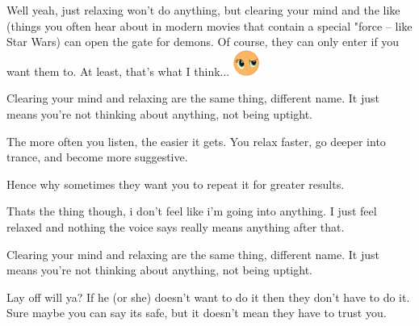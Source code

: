 \documentclass[ebook,12pt,oneside,openany]{memoir}
\newcommand{\mytexttilde}{\raisebox{0.5ex}{\texttildelow}}
\begin{document}
\begin{tcolorbox}[title=Harmonic Revelations,colback=brown!5!white,colframe=brown!75!black,coltitle=white]
\begin{tcolorbox}[title=\mytexttilde{}Chaotic Chicken\mytexttilde{}]
\par{Well yeah, just relaxing won't do anything, but clearing your mind and the like (things you often hear about in modern movies that contain a special "force -- like Star Wars) can open the gate for demons. Of course, they can only enter if you want them to. At least, that's what I think...  \includegraphics{images/mlp_huh.png}}
\end{tcolorbox}
\par{Clearing your mind and relaxing are the same thing, different name. It just means you're not thinking about anything, not being uptight.}
\end{tcolorbox}
\begin{tcolorbox}[title=The Original,colback=green!5!white,colframe=green!75!black,coltitle=white]
\begin{tcolorbox}[title=Chigens and Kay]
\par{The more often you listen, the easier it gets. You relax faster, go deeper into trance, and become more suggestive.}
\newline{}
\par{Hence why sometimes they want you to repeat it for greater results.}
\end{tcolorbox}
\par{Thats the thing though, i don't feel like i'm going into anything. I just feel relaxed and nothing the voice says really means anything after that.}
\newline{}
\begin{tcolorbox}[title=\mytexttilde{}Lawful Aeternae Salvtis\mytexttilde{}]
\par{Clearing your mind and relaxing are the same thing, different name. It just means you're not thinking about anything, not being uptight.}
\end{tcolorbox}
\par{Lay off will ya? If he (or she) doesn't want to do it then they don't have to do it. Sure maybe you can say its safe, but it doesn't mean they have to trust you. }
\end{tcolorbox}
\end{document}
